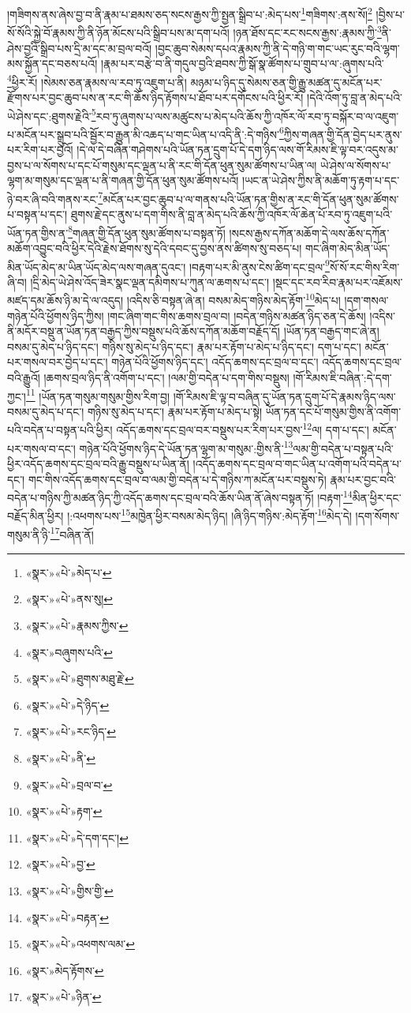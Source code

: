 །གཟིགས་ནས་ཞེས་བྱ་བ་ནི་རྣམ་པ་ཐམས་ཅད་སངས་རྒྱས་ཀྱི་སྤྱན་སྒྲིབ་པ་:མེད་པས་\footnote{«སྣར་»«པེ་»མེད་པ་}གཟིགས་:ནས་སོ།\footnote{«སྣར་»«པེ་»ནས་སུ།} །བྱིས་པ་སོ་སོའི་སྐྱེ་བོ་རྣམས་ཀྱི་ནི་ཉོན་མོངས་པའི་སྒྲིབ་པས་མ་དག་པའོ། །ཉན་ཐོས་དང་རང་སངས་རྒྱས་:རྣམས་ཀྱི་\footnote{«སྣར་»«པེ་»རྣམས་ཀྱིས་}ནི་ཤེས་བྱའི་སྒྲིབ་པས་དྲི་མ་དང་མ་བྲལ་བའོ། །བྱང་ཆུབ་སེམས་དཔའ་རྣམས་ཀྱི་ནི་དེ་གཉི་ག་གང་ཡང་རུང་བའི་ལྷག་མས་སྐྱོན་དང་བཅས་པའོ། །རྣམ་པར་བརྩེ་བ་ནི་གདུལ་བྱའི་ཐབས་ཀྱི་སྒོ་སྣ་ཚོགས་པ་གྲུབ་པ་ལ་:ཞུགས་པའི་\footnote{«སྣར་»བཞུགས་པའི་}ཕྱིར་རོ། །སེམས་ཅན་རྣམས་ལ་རབ་ཏུ་འཇུག་པ་ནི། མཉམ་པ་ཉིད་དུ་སེམས་ཅན་གྱི་རྒྱུ་མཚན་དུ་མངོན་པར་རྫོགས་པར་བྱང་ཆུབ་པས་ན་རང་གི་ཆོས་ཉིད་རྟོགས་པ་ཐོབ་པར་དགོངས་པའི་ཕྱིར་རོ། །དེའི་འོག་ཏུ་བླ་ན་མེད་པའི་ཡེ་ཤེས་དང་:ཐུགས་རྗེའི་\footnote{«སྣར་»«པེ་»ཐུགས་མཐུ་རྗེ་}རབ་ཏུ་ཞུགས་པ་ལས་མཚུངས་པ་མེད་པའི་ཆོས་ཀྱི་འཁོར་ལོ་རབ་ཏུ་བསྐོར་བ་ལ་འཇུག་པ་མངོན་པར་སྒྲུབ་པའི་སྦྱོར་བ་རྒྱུན་མི་འཆད་པ་གང་ཡིན་པ་འདི་ནི་:དེ་གཉིས་\footnote{«སྣར་»«པེ་»དེ་ཉིད་}ཀྱིས་གཞན་གྱི་དོན་བྱེད་པར་ནུས་པར་རིག་པར་བྱའོ། །དེ་ལ་དེ་བཞིན་གཤེགས་པའི་ཡོན་ཏན་དྲུག་པོ་དེ་དག་ཉིད་ལས་གོ་རིམས་ཇི་ལྟ་བར་འདུས་མ་བྱས་པ་ལ་སོགས་པ་དང་པོ་གསུམ་དང་ལྡན་པ་ནི་རང་གི་དོན་ཕུན་སུམ་ཚོགས་པ་ཡིན་ལ། ཡེ་ཤེས་ལ་སོགས་པ་ལྷག་མ་གསུམ་དང་ལྡན་པ་ནི་གཞན་གྱི་དོན་ཕུན་སུམ་ཚོགས་པའོ། །ཡང་ན་ཡེ་ཤེས་ཀྱིས་ནི་མཆོག་ཏུ་རྟག་པ་དང་ཉེ་བར་ཞི་བའི་གནས་རང་\footnote{«སྣར་»«པེ་»རང་ཉིད་}མངོན་པར་བྱང་ཆུབ་པ་ལ་གནས་པའི་ཡོན་ཏན་གྱིས་ན་རང་གི་དོན་ཕུན་སུམ་ཚོགས་པ་བསྟན་པ་དང་། ཐུགས་རྗེ་དང་ནུས་པ་དག་གིས་ནི་བླ་ན་མེད་པའི་ཆོས་ཀྱི་འཁོར་ལོ་ཆེན་པོ་རབ་ཏུ་འཇུག་པའི་ཡོན་ཏན་གྱིས་ན་\footnote{«སྣར་»«པེ་»ནི་}གཞན་གྱི་དོན་ཕུན་སུམ་ཚོགས་པ་བསྟན་ཏོ། །སངས་རྒྱས་དཀོན་མཆོག་དེ་ལས་ཆོས་དཀོན་མཆོག་འབྱུང་བའི་ཕྱིར་དེའི་རྗེས་ཐོགས་སུ་དེའི་དབང་དུ་བྱས་ནས་ཚིགས་སུ་བཅད་པ། གང་ཞིག་མེད་མིན་ཡོད་མིན་ཡོད་མེད་མ་ཡིན་ཡོད་མེད་ལས་གཞན་དུའང་། །བརྟག་པར་མི་ནུས་ངེས་ཚིག་དང་བྲལ་\footnote{«སྣར་»«པེ་»བྲལ་བ་}སོ་སོ་རང་གིས་རིག་ཞི་བ། །དྲི་མེད་ཡེ་ཤེས་འོད་ཟེར་སྣང་ལྡན་དམིགས་པ་ཀུན་ལ་ཆགས་པ་དང་། །སྡང་དང་རབ་རིབ་རྣམ་པར་འཇོམས་མཛད་དམ་ཆོས་ཉི་མ་དེ་ལ་འདུད། །འདིས་ཅི་བསྟན་ཞེ་ན། བསམ་མེད་གཉིས་མེད་རྟོག་\footnote{«སྣར་»«པེ་»རྟག་}མེད་པ། །དག་གསལ་གཉེན་པོའི་ཕྱོགས་ཉིད་ཀྱིས། །གང་ཞིག་གང་གིས་ཆགས་བྲལ་བ། །བདེན་གཉིས་མཚན་ཉིད་ཅན་དེ་ཆོས། །འདིས་ནི་མདོར་བསྡུ་ན་ཡོན་ཏན་བརྒྱད་ཀྱིས་བསྡུས་པའི་ཆོས་དཀོན་མཆོག་བརྗོད་དོ། །ཡོན་ཏན་བརྒྱད་གང་ཞེ་ན། བསམ་དུ་མེད་པ་ཉིད་དང་། གཉིས་སུ་མེད་པ་ཉིད་དང་། རྣམ་པར་རྟོག་པ་མེད་པ་ཉིད་དང་། དག་པ་དང་། མངོན་པར་གསལ་བར་བྱེད་པ་དང་། གཉེན་པོའི་ཕྱོགས་ཉིད་དང་། འདོད་ཆགས་དང་བྲལ་བ་དང་། འདོད་ཆགས་དང་བྲལ་བའི་རྒྱུའོ། །ཆགས་བྲལ་ཉིད་ནི་འགོག་པ་དང་། །ལམ་གྱི་བདེན་པ་དག་གིས་བསྡུས། །གོ་རིམས་ཇི་བཞིན་:དེ་དག་ཀྱང་།\footnote{«སྣར་»«པེ་»དེ་དག་དང་།} །ཡོན་ཏན་གསུམ་གསུམ་གྱིས་རིག་བྱ། །གོ་རིམས་ཇི་ལྟ་བ་བཞིན་དུ་ཡོན་ཏན་དྲུག་པོ་དེ་རྣམས་ཉིད་ལས་བསམ་དུ་མེད་པ་དང་། གཉིས་སུ་མེད་པ་དང་། རྣམ་པར་རྟོག་པ་མེད་པ་སྟེ། ཡོན་ཏན་དང་པོ་གསུམ་གྱིས་ནི་འགོག་པའི་བདེན་པ་བསྟན་པའི་ཕྱིར། འདོད་ཆགས་དང་བྲལ་བར་བསྡུས་པར་རིག་པར་བྱས་\footnote{«སྣར་»«པེ་»བྱ་}ལ། དག་པ་དང་། མངོན་པར་གསལ་བ་དང་། གཉེན་པོའི་ཕྱོགས་ཉིད་དེ་ཡོན་ཏན་ལྷག་མ་གསུམ་:གྱིས་ནི་\footnote{«སྣར་»«པེ་»གྱིས་གྱི་}ལམ་གྱི་བདེན་པ་བསྟན་པའི་ཕྱིར་འདོད་ཆགས་དང་བྲལ་བའི་རྒྱུ་བསྡུས་པ་ཡིན་ནོ། །འདོད་ཆགས་དང་བྲལ་བ་གང་ཡིན་པ་འགོག་པའི་བདེན་པ་དང་། གང་གིས་འདོད་ཆགས་དང་བྲལ་བ་ལམ་གྱི་བདེན་པ་དེ་གཉིས་ཀ་མངོན་པར་བསྡུས་ཏེ། རྣམ་པར་བྱང་བའི་བདེན་པ་གཉིས་ཀྱི་མཚན་ཉིད་ཀྱི་འདོད་ཆགས་དང་བྲལ་བའི་ཆོས་ཡིན་ནོ་ཞེས་བསྟན་ཏོ། །བརྟག་\footnote{«སྣར་»«པེ་»བརྟན་}མིན་ཕྱིར་དང་བརྗོད་མིན་ཕྱིར། །:འཕགས་པས་\footnote{«སྣར་»«པེ་»འཕགས་ལམ་}མཁྱེན་ཕྱིར་བསམ་མེད་ཉིད། །ཞི་ཉིད་གཉིས་:མེད་རྟོག་\footnote{«སྣར་»མེད་རྟོགས་}མེད་དེ། །དག་སོགས་གསུམ་ནི་ཉི་\footnote{«སྣར་»«པེ་»ཉིན་}བཞིན་ནོ། 